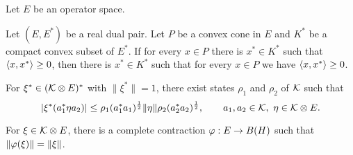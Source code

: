 \documentclass{../../large}
\begin{document}
\begin{prb}
Let $E$ be an operator space.
\begin{parts}
\item Let $(E,E^*)$ be a real dual pair. Let $P$ be a convex cone in $E$ and $K^*$ be a compact convex subset of $E^*$.
If for every $x\in P$ there is $x^*\in K^*$ such that $\langle x,x^*\rangle\ge0$, then there is $x^*\in K^*$ such that for every $x\in P$ we have $\langle x,x^*\rangle\ge0$.
\item For $\xi^*\in(\mathcal{K}\otimes E)^*$ with $\|\xi^*\|=1$, there exist states $\rho_1$ and $\rho_2$ of $\mathcal{K}$ such that
\[|\xi^*(a_1^*\eta a_2)|\le\rho_1(a_1^*a_1)^{\frac12}\|\eta\|\rho_2(a_2^*a_2)^{\frac12},\qquad a_1,a_2\in\mathcal{K},\ \eta\in \mathcal{K}\otimes E.\]
\item For $\xi\in\mathcal{K}\otimes E$, there is a complete contraction $\varphi:E\to B(H)$ such that $\|\varphi(\xi)\|=\|\xi\|$.
\end{parts}
\end{prb}
\end{document}
